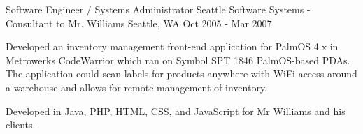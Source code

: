 \begin{cventries}
    \cventry
    {Software Engineer / Systems Administrator}
    {Seattle Software Systems - Consultant to Mr. Williams} 
    {Seattle, WA} 
    {Oct 2005 - Mar 2007} 
    { 
        \begin{cvitems}
        \item {Developed an inventory management front-end application for PalmOS 4.x in Metrowerks CodeWarrior which ran on Symbol SPT 1846 PalmOS-based PDAs. The application could scan labels for products anywhere with WiFi access around a warehouse and allows for remote management of inventory.}
        \item {Developed in Java, PHP, HTML, CSS, and JavaScript for Mr Williams and his clients.}
        \end{cvitems}
    }

\end{cventries}

